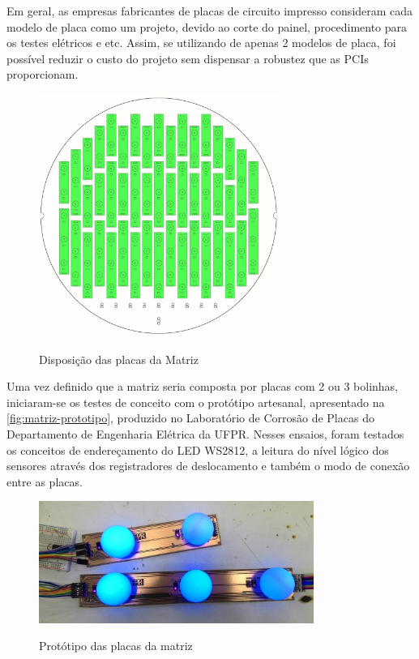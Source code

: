 Em geral, as empresas fabricantes de placas de circuito impresso consideram cada modelo de placa como um projeto, devido ao corte do painel, procedimento para os testes elétricos e etc. Assim, se utilizando de apenas 2 modelos de placa, foi possível reduzir o custo do projeto sem dispensar a robustez que as PCIs proporcionam.

\begin{figure}[H]
    \centering
    \caption{Disposição das placas da Matriz}
    \includegraphics[width=0.7\textwidth]{./dados/figuras/placas-matriz-colunas}
    \label{fig:placas-matriz-colunas}
\end{figure}

Uma vez definido que a matriz seria composta por placas com 2 ou 3 bolinhas, iniciaram-se os testes de conceito com o protótipo artesanal, apresentado na \autoref{fig:matriz-prototipo}, produzido no Laboratório de Corrosão de Placas do Departamento de Engenharia Elétrica da UFPR. Nesses ensaios, foram testados os conceitos de endereçamento do LED WS2812, a leitura do nível lógico dos sensores através dos registradores de deslocamento e também o modo de conexão entre as placas.

\begin{figure}[H]
    \centering
    \caption{Protótipo das placas da matriz}
    \includegraphics[width=0.8\textwidth]{./dados/figuras/mesa-protoboard}
    \label{fig:matriz-prototipo}
\end{figure}

